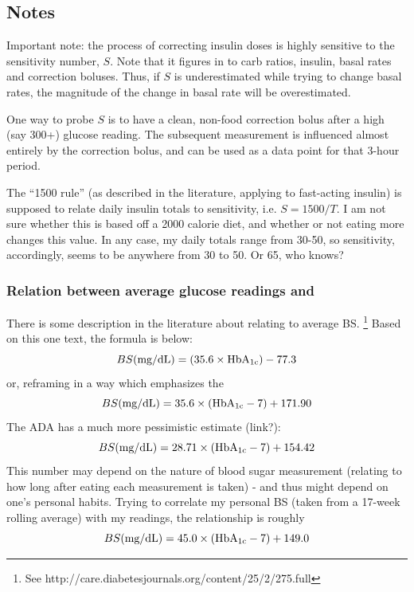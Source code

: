 \subsection{Notes}

Important note: the process of correcting insulin doses is highly sensitive to the sensitivity number, 
$S$. Note that it figures in to carb ratios, insulin, basal rates and correction boluses. Thus, if 
$S$ is underestimated while trying to change basal rates, the magnitude of the change in basal rate 
will be overestimated.

One way to probe $S$ is to have a clean, non-food correction bolus after a high (say 300+) glucose 
reading. The subsequent measurement is influenced almost entirely by the correction bolus, and can 
be used as a data point for that 3-hour period.

The ``1500 rule'' (as described in the literature, applying to fast-acting insulin) is supposed to 
relate daily insulin totals to sensitivity, i.e. $S=1500/T$. I am not sure whether this is based off 
a 2000 calorie diet, and whether or not eating more changes this value. In any case, my daily totals 
range from 30-50, so sensitivity, accordingly, seems to be anywhere from 30 to 50. Or 65, who knows?

\subsubsection{Relation between average glucose readings and \hbac}
There is some description in the literature about relating \hbac to average BS.
\footnote{See http://care.diabetesjournals.org/content/25/2/275.full}
Based on this one text, the formula is below:
\[
BS(\text{mg/dL})=(35.6 \times \text{HbA}_\text{1c})-77.3
\]
or, reframing in a way which emphasizes the 
\[
BS(\text{mg/dL})=35.6\times(\text{HbA}_\text{1c}-7)+171.90
\]
The ADA has a much more pessimistic estimate (link?):
\[
BS(\text{mg/dL})=28.71\times(\text{HbA}_\text{1c}-7)+154.42
\]
This number may depend on the nature of blood sugar measurement (relating to how long after eating
each measurement is taken) - and thus might depend on one's personal habits. Trying to correlate
my personal BS (taken from a 17-week rolling average) with my \hbac readings, the relationship is
roughly
\[
BS(\text{mg/dL})=45.0\times(\text{HbA}_\text{1c}-7)+149.0
\]

